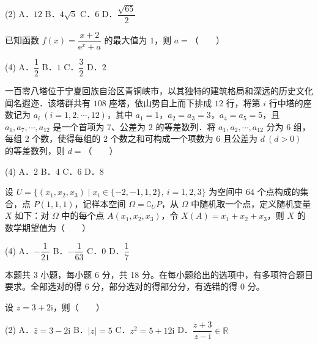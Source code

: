 \begin{gkopts}(2)
\task A．$12$
\task B．$4\sqrt{5}$
\task C．$6$
\task D．$\dfrac{\sqrt{65}}{2}$
\end{gkopts}

已知函数 $f(x)=\dfrac{x+2}{\mathrm{e}^{x}+a}$ 的最大值为 $1$，则 $a=$（　　）

\begin{gkopts}(4)
\task A．$\dfrac{1}{2}$
\task B．$1$
\task C．$\dfrac{3}{2}$
\task D．$2$
\end{gkopts}

一百零八塔位于宁夏回族自治区青铜峡市，以其独特的建筑格局和深远的历史文化闻名遐迩．该塔群共有 $108$ 座塔，依山势自上而下排成 $12$ 行，将第 $i$ 行中塔的座数记为 $a_i\ (i=1,2,\cdots,12)$，其中 $a_1=1$，$a_2=a_3=3$，$a_4=a_5=5$，且 $a_6,a_7,\cdots,a_{12}$ 是一个首项为 $7$、公差为 $2$ 的等差数列．将 $a_1,a_2,\cdots,a_{12}$ 分为 $6$ 组，每组 $2$ 个数，使得每组的 $2$ 个数之和可构成一个项数为 $6$ 且公差为 $d\ (d>0)$ 的等差数列，则 $d=$（　　）

\begin{gkopts}(4)
\task A．$2$
\task B．$4$
\task C．$6$
\task D．$8$
\end{gkopts}

设 $U=\{(x_1,x_2,x_3)\mid x_i\in\{-2,-1,1,2\},\ i=1,2,3\}$ 为空间中 $64$ 个点构成的集合，点 $P(1,1,1)$，记样本空间 $\Omega=\complement_U P$，从 $\Omega$ 中随机取一个点，定义随机变量 $X$ 如下：对 $\Omega$ 中的每个点 $A(x_1,x_2,x_3)$，令 $X(A)=x_1+x_2+x_3$，则 $X$ 的数学期望值为（　　）

\begin{gkopts}(4)
\task A．$-\dfrac{1}{21}$
\task B．$-\dfrac{1}{63}$
\task C．$0$
\task D．$\dfrac{1}{7}$
\end{gkopts}

\par\medskip


\begin{gktip}
本题共 3 小题，每小题 6 分，共 18 分。在每小题给出的选项中，有多项符合题目要求。全部选对的得 6 分，部分选对的得部分分，有选错的得 0 分。
\end{gktip}

设 $z=3+2\mathrm{i}$，则（　　）

\begin{gkopts}(2)
\task A．$\bar{z}=3-2\mathrm{i}$
\task B．$|z|=5$
\task C．$z^2=5+12\mathrm{i}$
\task D．$\dfrac{z+3}{z-\mathrm{i}}\in\mathbb{R}$
\end{gkopts}

